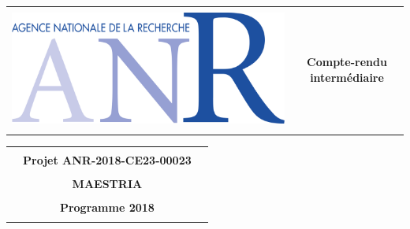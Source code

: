 \begin{table}[htbp]
    \centering
    \begin{tabular}{|c|c|}
    \hline
    &\\
      \multirow{3}{*}{\includegraphics[width=0.25\columnwidth]{img/logo_anr.png}}   & \\
      &\LARGE{\textbf{\textcolor{bleu}{Compte-rendu intermédiaire}}} \\
      & \\ 
      &\\\hline
    \end{tabular}

\end{table}
\vspace{1.2cm}
\begin{table}[htbp]
    \centering
    \begin{tabular}{|m{2.5cm}cm{2.5cm}|}
  \hline 
&&  \\
&  \Large{\textbf{\textcolor{bleu}{Projet ANR-2018-CE23-00023}}}& \\
&&  \\
&\huge{\textbf{\textcolor{bleu}{MAESTRIA}}}& \\
&&  \\
&\Large{\textbf{\textcolor{bleu}{Programme 2018}}}&\\
&&\\\hline
    \end{tabular}

\end{table}   

\setcounter{tocdepth}{2}
\tableofcontents
\newpage